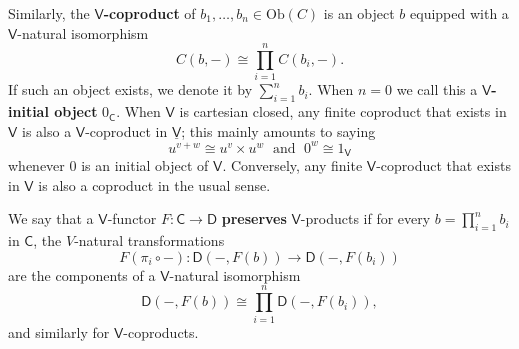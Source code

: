 \documentclass{amsart}
\theoremstyle{definition}
\newcommand{\V}{\mathsf{V}}
\newcommand{\D}{\mathsf{D}}
\newcommand{\C}{\mathsf{C}}
\newcommand{\Obj}{\mathrm{Ob}}
\newcommand{\maps}{\colon}
\begin{document}
Similarly, the \textbf{$\V$-coproduct} of $b_1, \dots, b_n \in \Obj(C)$ is an object $b$ equipped with a $\V$-natural isomorphism
\[           C(b,-) \cong \prod_{i = 1}^n C(b_i,-). \]
If such an object exists, we denote it by $\sum_{i=1}^n b_i$.  
When $n=0$ we call this a \textbf{$\V$-initial object} $0_\C$.   When $\V$ is cartesian
closed, any finite coproduct that exists in $\V$ is also a $\V$-coproduct in $\underline{\V}$;
this mainly amounts to saying
\[          u^{v+w} \cong u^v \times u^w \; \textrm{ and } \;  0^w \cong 1_\V \]
whenever $0$ is an initial object of $\V$.  Conversely, any finite $\V$-coproduct that
exists in $\V$ is also a coproduct in the usual sense.

We say that a $\V$-functor $F\maps \C\to \D$ \textbf{preserves} $\V$-products if for every $b = \prod_{i=1}^n b_i$ in $\C$, the $V$-natural transformations
\[     F(\pi_i \circ -) \maps \D(-,F(b)) \to \D(-,F(b_i))   \]
are the components of a $\V$-natural isomorphism 
\[           \D(-,F(b)) \cong \prod_{i=1}^n \D(-,F(b_i)), \]
and similarly for $\V$-coproducts. 
\end{document}
